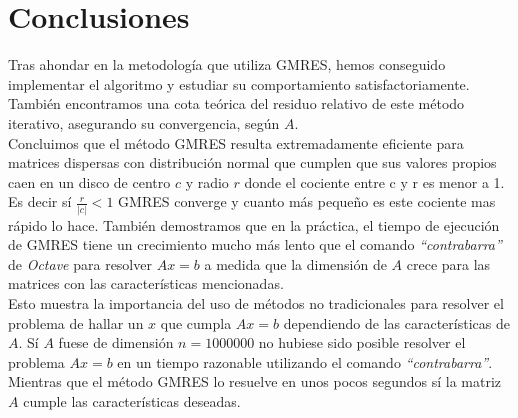 \documentclass{endm}
\begin{document}
\section{Conclusiones}\label{Conclusions}
Tras ahondar en la metodología que utiliza GMRES, hemos conseguido implementar el algoritmo y estudiar su comportamiento satisfactoriamente. También encontramos una cota teórica del residuo relativo de este método iterativo, asegurando su convergencia, según $A$.\\
Concluimos que el m\'etodo GMRES resulta extremadamente eficiente para matrices dispersas con distribución normal que cumplen que sus valores propios caen en un disco de centro $c$ y radio $r$ donde el cociente entre c y r es menor a 1. Es decir sí $\frac{r}{|c|} < 1$ GMRES converge y cuanto más pequeño es este cociente mas rápido lo hace. También demostramos que en la pr\'actica, el tiempo de ejecución de GMRES tiene un crecimiento mucho más lento que el comando \textit{“contrabarra”} de \textit{Octave} para resolver $Ax=b$ a medida que la dimensión de $A$ crece para las matrices con las características mencionadas.\\
Esto muestra la importancia del uso de métodos no tradicionales para resolver el problema de hallar un $x$ que cumpla $Ax=b$ dependiendo de las características de $A$. Sí $A$ fuese de dimensión $n=1000000$ no hubiese sido posible resolver el problema $Ax=b$ en un tiempo razonable utilizando el comando \textit{“contrabarra”}. Mientras que el método GMRES lo resuelve en unos pocos segundos sí la matriz $A$ cumple las características deseadas.

%



\end{document}
